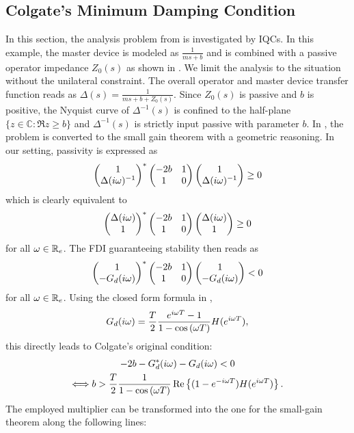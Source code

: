 \subsection{Colgate's Minimum Damping Condition}\label{sec:colgate}

In this section, the analysis problem from \cite{colgate2,colgate3} is investigated by IQCs. 
In this example, the master device {is} modeled as $\frac{1}{ms+b}$ {and} is combined with 
a passive operator impedance $Z_0(s)$ {as shown in} . We limit the 
analysis to the {situation} without the unilateral constraint. The overall operator and master 
device transfer function reads as $\Delta(s) = \frac{1}{ms+b+Z_0(s)}$. Since $Z_0(s)$ is 
passive and $b$ {is positive}, the Nyquist curve of $\Delta^{-1}(s)$ is confined to the 
half-plane $\{z\in\mathbb{C}: \Re{z} \geq b\}$ {and $\Delta^{-1}(s)$ is strictly input 
passive with parameter $b$.} In \cite{colgate2}, the problem is converted to the small 
gain theorem with a geometric reasoning. In our setting, passivity is expressed as
\[
\begin{pmatrix}1\\ \Delta(i\omega)^{-1} \end{pmatrix}^*
\begin{pmatrix}-2b &1\\1 &0\end{pmatrix}
\begin{pmatrix}1\\ \Delta(i\omega)^{-1} \end{pmatrix} \geq 0
\]
which is clearly equivalent to
\[
\begin{pmatrix}\Delta(i\omega)\\ 1 \end{pmatrix}^*\begin{pmatrix}-2b &1\\1 &0\end{pmatrix}\begin{pmatrix}\Delta(i\omega)\\1\end{pmatrix} \geq 0
\]
for all $\omega\in\mathbb{R}_e$. The FDI guaranteeing stability then reads as
\[
\begin{pmatrix}1\\ -G_d(i\omega)\end{pmatrix}^*\begin{pmatrix}-2b &1\\1 &0\end{pmatrix}\begin{pmatrix}1\\ -G_d(i\omega)\end{pmatrix} < 0
\]
for all $\omega\in\mathbb{R}_e$. Using the closed form formula in \cite{colgate2},
\begin{equation*}
G_d(i\omega) = \frac{T}{2}\frac{e^{i\omega T}-1}{1- \cos{(\omega T)}}H(e^{i\omega T}),
\end{equation*}
this directly leads to Colgate's original condition:
\begin{multline*}%
-2b - G_d^*(\iw) - G_d(\iw) < 0 \\
\Longleftrightarrow b > \frac{T}{2}\frac{1}{1-\cos{(\omega T)}}\Re{(1-e^{-\iw T})H({e^{\iw T}})}.
\end{multline*}
{The employed multiplier can be transformed into the one for the small-gain theorem along the following lines:}
